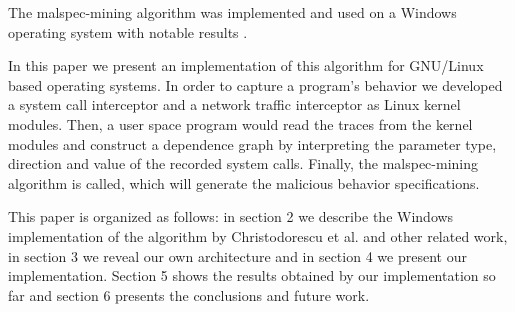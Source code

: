 The malspec-mining algorithm was implemented and used on a Windows operating system with notable results \cite{mining-specifications}.

In this paper we present an implementation of this algorithm for GNU/Linux based operating systems. In order to capture a program’s behavior we developed a system call interceptor and a network traffic interceptor as Linux kernel modules. Then, a user space program would read the traces from the kernel modules and construct a dependence graph by interpreting the parameter type, direction and value of the recorded system calls. Finally, the malspec-mining algorithm is called, which will generate the malicious behavior specifications.

This paper is organized as follows: in section 2 we describe the Windows implementation of the algorithm by Christodorescu et al. and other related work, in section 3 we reveal our own architecture and in section 4 we present our implementation. Section 5 shows the results obtained by our implementation so far and section 6 presents the conclusions and future work.



